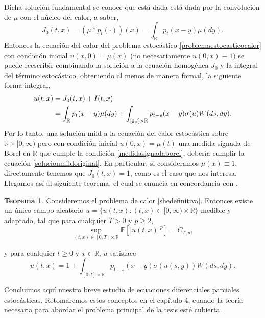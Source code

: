\documentclass[letterpaper,twoside,12pt]{book}
\newcommand{\R}{\mathbb{R}}
\newcommand{\E}{\mathbb{E}}
\newcommand{\1}{\mathds{1}}
\newcommand{\abs}[1]{\left\lvert #1 \right\rvert}
\theoremstyle{definition}
\theoremstyle{definition}
\newtheorem{teo}{Teorema}
\theoremstyle{remark}
\theoremstyle{definition}
\theoremstyle{definition}
\theoremstyle{definition}
\theoremstyle{definition}
\theoremstyle{definition}
\begin{document}
Dicha solución fundamental se conoce que está dada está dada por la convolución de $\mu$ con el núcleo del calor, a saber, 
\[
J_0(t,x)=(\mu*p_t(\cdot))(x)=\int_{\R}p_t(x-y)\mu(dy).
\]
Entonces la ecuación del calor del problema estocástico \eqref{problemaestocasticocalor} con condición inicial $u(x,0)=\mu(x)$ (no necesariamente $u(0,x)\equiv1)$ se puede reescribir combinando la solución a la ecuación homogénea $J_0$ y la integral del término estocástico, obteniendo al menos de manera formal, la siguiente forma integral,
\begin{align}
   u(t,x)&=J_0(t,x)+I(t,x)\notag\\
   &=\int_{\R}p_t(x-y)\mu(dy)+\int_{[0,t]\times\R}p_{t-s}(x-y)\sigma(u)W(ds,dy)\label{solucionmildoriginal}.
\end{align}
Por lo tanto, una solución mild a la ecuación del calor estocástica sobre $\R\times[0,\infty)$ pero con condición inicial $u(0,x)=\mu(t)$ una medida signada de Borel en $\R$ que cumple la condición \eqref{medidasignadaborel}, debería cumplir la ecuación \eqref{solucionmildoriginal}. En particular, si consideramos $\mu(x)\equiv 1$, directamente tenemos que $J_0(t,x)=1$, como es el caso que nos interesa. Llegamos así al siguiente teorema, el cual se enuncia en concordancia con \cite[proposición 2.1]{KUZGUN202268}.

\begin{teo}\label{solucionmild}
 Consideremos el problema de calor \eqref{shedefinitiva}. Entonces existe un único campo aleatorio $u=\{u(t,x): (t,x)\in [0,\infty)\times \R\}$ medible y adaptado, tal que para cualquier $T>0$ y $p\geq2$, 
 \begin{equation}\label{cotasolucionmild}
   \sup_{(t,x)\in [0,T]\times\R}\E\left[\abs{u(t,x)}^p\right]=C_{T,p},
 \end{equation}
 
 y para cualquier $t\geq0$ y $x\in \R$, $u$ satisface
 \begin{equation}\label{eqsolucionmild}
   u(t,x)=1+\int_{[0,t]\times \R}^{}p_{t-s}(x-y)\sigma(u(s,y))W(ds,dy).
 \end{equation}
 \end{teo}
Concluimos aquí nuestro breve estudio de ecuaciones diferenciales parciales estocásticas. Retomaremos estos conceptos en el capítulo 4, cuando la teoría necesaria para abordar el problema principal de la tesis esté cubierta.
\end{document}

